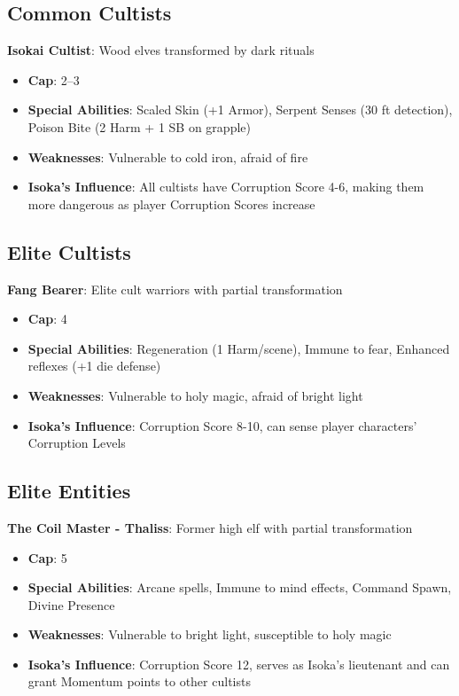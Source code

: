 \documentclass[11pt]{article}
\begin{document}
\subsection{Common Cultists}

\textbf{Isokai Cultist}: Wood elves transformed by dark rituals
\begin{itemize}[leftmargin=*]
    \item \textbf{Cap}: 2--3
    \item \textbf{Special Abilities}: Scaled Skin (+1 Armor), Serpent Senses (30 ft detection), Poison Bite (2 Harm + 1 SB on grapple)
    \item \textbf{Weaknesses}: Vulnerable to cold iron, afraid of fire
    \item \textbf{Isoka's Influence}: All cultists have Corruption Score 4-6, making them more dangerous as player Corruption Scores increase
\end{itemize}

\subsection{Elite Cultists}

\textbf{Fang Bearer}: Elite cult warriors with partial transformation
\begin{itemize}[leftmargin=*]
    \item \textbf{Cap}: 4
    \item \textbf{Special Abilities}: Regeneration (1 Harm/scene), Immune to fear, Enhanced reflexes (+1 die defense)
    \item \textbf{Weaknesses}: Vulnerable to holy magic, afraid of bright light
    \item \textbf{Isoka's Influence}: Corruption Score 8-10, can sense player characters' Corruption Levels
\end{itemize}

\subsection{Elite Entities}

\textbf{The Coil Master - Thaliss}: Former high elf with partial transformation
\begin{itemize}[leftmargin=*]
    \item \textbf{Cap}: 5
    \item \textbf{Special Abilities}: Arcane spells, Immune to mind effects, Command Spawn, Divine Presence
    \item \textbf{Weaknesses}: Vulnerable to bright light, susceptible to holy magic
    \item \textbf{Isoka's Influence}: Corruption Score 12, serves as Isoka's lieutenant and can grant Momentum points to other cultists
\end{itemize}
\end{document}
